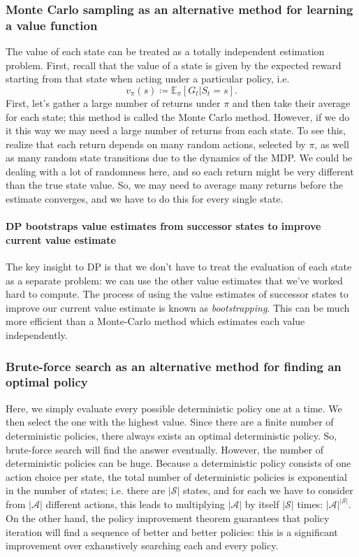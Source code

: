 \documentclass[12pt]{article}
\begin{document}
\subsubsection{Monte Carlo sampling as an alternative method for learning a     value function}
The value of each state can be treated as a totally independent estimation problem. First, recall that the value of a state is given by the expected reward starting from that state when acting under a particular policy, i.e.
\[
  v_\pi(s) \coloneqq \mathbb E_\pi\left[G_t | S_t = s \right].
\]
First, let's gather a large number of returns under $\pi$ and then take their average for each state; this method is called the Monte Carlo method. However, if we do it this way we may need a large number of returns from each state. To see this, realize that each return depends on many random actions, selected by $\pi$, as well as many random state transitions due to the dynamics of the MDP. We could be dealing with a lot of randomness here, and so each return might be very different than the true state value. So, we may need to average many returns before the estimate converges, and we have to do this for every single state. 

\paragraph{DP bootstraps value estimates from successor states to improve current value estimate} 
The key insight to DP is that we don't have to treat the evaluation of each state as a separate problem: we can use the other value estimates that we've worked hard to compute. The process of using the value estimates of successor states to improve our current value estimate is known as \emph{bootstrapping}. This can be much more efficient than a Monte-Carlo method which estimates each value independently.

\subsubsection{Brute-force search as an alternative method for finding an   optimal policy}
Here, we simply evaluate every possible deterministic policy one at a time. We then select the one with the highest value. Since there are a finite number of deterministic policies, there always exists an optimal deterministic policy. So, brute-force search will find the answer eventually. However, the number of deterministic policies can be huge. Because a deterministic policy consists of one action choice per state, the total number of deterministic policies is exponential in the number of states; i.e. there are $|\mathcal S|$ states, and for each we have to consider from $|\mathcal A|$ different actions, this leads to multiplying $|\mathcal A|$ by itself $|\mathcal S|$ times: $|\mathcal A|^{|\mathcal S|}$. On the other hand, the policy improvement theorem guarantees that policy iteration will find a sequence of better and better policies: this is a significant improvement over exhaustively searching each and every policy. 
\end{document}
